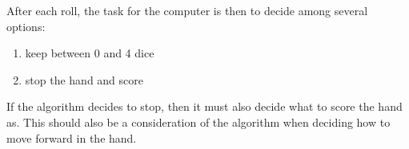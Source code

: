\documentclass[10pt, onecolumn]{article}
\begin{document}
After each roll, the task for the computer is then to decide among several options:
\begin{enumerate}
 \item keep between 0 and 4 dice
 \item stop the hand and score
\end{enumerate}

If the algorithm decides to stop, then it must also decide what to score the hand as. This should also be a consideration of the
algorithm when deciding how to move forward in the hand.
\end{document}
